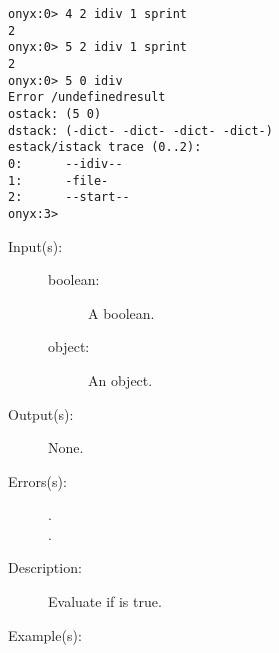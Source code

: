 \begin{description}
\begin{description}
\begin{verbatim}
onyx:0> 4 2 idiv 1 sprint
2
onyx:0> 5 2 idiv 1 sprint
2
onyx:0> 5 0 idiv
Error /undefinedresult
ostack: (5 0)
dstack: (-dict- -dict- -dict- -dict-)
estack/istack trace (0..2):
0:      --idiv--
1:      -file-
2:      --start--
onyx:3>
		\end{verbatim}
	\end{description}
\label{systemdict:if}
\item[{\onyxop{boolean object}{if}{--}}: ]
	\begin{description}\item[]
	\item[Input(s): ]
		\begin{description}\item[]
		\item[boolean: ]
			A boolean.
		\item[object: ]
			An object.
		\end{description}
	\item[Output(s): ] None.
	\item[Errors(s): ]
		\begin{description}\item[]
		\item[.]
		\item[.]
		\end{description}
	\item[Description: ]
		Evaluate  if  is true.
	\item[Example(s): ]\begin{verbatim}


\end{verbatim}
\end{description}
\end{description}
